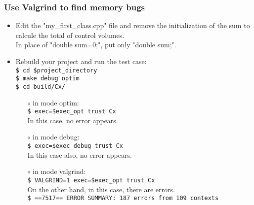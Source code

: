 \documentclass[10pt, hyperref={unicode=true,pdfusetitle, bookmarks=true,bookmarksnumbered=false,bookmarksopen=false, breaklinks=false,pdfborder={0 0 1},backref=true,colorlinks=true,linkcolor=darkblue,pageanchor, urlcolor=darkblue}]{beamer}
\begin{document}
\begin{frame}
\frametitle{Use Valgrind to find memory bugs}
\begin{block}{}

\begin{itemize}
\item Edit the "my\_first\_class.cpp" file and remove the initialization of the sum to calcule the total of control volumes.\\
In place of "double sum=0;", put only "double sum;".\\
\item Rebuild your project and run the test case:\\
\texttt{\$ cd \$project\_directory}\\
\texttt{\$ make debug optim}\\
\texttt{\$ cd build/Cx/}\\
    \begin{itemize}
    \item [$\circ$] in mode optim:\\
    \texttt{\$ exec=\$exec\_opt trust Cx}\\
In this case, no error appears.
    \item [$\circ$] in mode debug:\\
    \texttt{\$ exec=\$exec\_debug trust Cx}\\
In this case also, no error appears.
    \item [$\circ$] in mode valgrind:\\
    \texttt{\$ VALGRIND=1 exec=\$exec\_opt trust Cx}\\
On the other hand, in this case, there are errors.\\
    \texttt{\$ ==7517== ERROR SUMMARY: 187 errors from 109 contexts}
    \end{itemize}
\end{itemize}

\end{block}
\end{frame}
\end{document}
